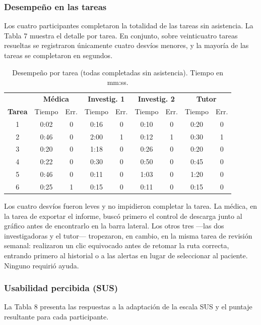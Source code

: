 \subsubsection{Desempeño en las tareas}
Los cuatro participantes completaron la totalidad de las tareas sin asistencia. La Tabla 7 muestra el detalle por tarea. En conjunto, sobre veinticuatro tareas resueltas se registraron únicamente cuatro desvíos menores, y la mayoría de las tareas se completaron en segundos.\\


\begin{table}[h]
\centering
\footnotesize
\setlength{\tabcolsep}{4pt}
\begin{tabular}{c cc cc cc cc}
\hline
 & \multicolumn{2}{c}{\textbf{Médica}} & \multicolumn{2}{c}{\textbf{Investig. 1}} & \multicolumn{2}{c}{\textbf{Investig. 2}} & \multicolumn{2}{c}{\textbf{Tutor}} \\
\textbf{Tarea} & Tiempo & Err. & Tiempo & Err. & Tiempo & Err. & Tiempo & Err. \\
\hline
1 & 0:02 & 0 & 0:16 & 0 & 0:10 & 0 & 0:20 & 0 \\
2 & 0:46 & 0 & 2:00 & 1 & 0:12 & 1 & 0:30 & 1 \\
3 & 0:20 & 0 & 1:18 & 0 & 0:26 & 0 & 0:20 & 0 \\
4 & 0:22 & 0 & 0:30 & 0 & 0:50 & 0 & 0:45 & 0 \\
5 & 0:46 & 0 & 0:11 & 0 & 1:03 & 0 & 1:20 & 0 \\
6 & 0:25 & 1 & 0:15 & 0 & 0:11 & 0 & 0:15 & 0 \\
\hline
\end{tabular}
\caption{Desempeño por tarea (todas completadas sin asistencia). Tiempo en mm:ss.}
\end{table}
Los cuatro desvíos fueron leves y no impidieron completar la tarea. La médica, en la tarea de exportar el informe, buscó primero el control de descarga junto al gráfico antes de encontrarlo en la barra lateral. Los otros tres —las dos investigadoras y el tutor— tropezaron, en cambio, en la misma tarea de revisión semanal: realizaron un clic equivocado antes de retomar la ruta correcta, entrando primero al historial o a las alertas en lugar de seleccionar al paciente. Ninguno requirió ayuda.\\


\subsubsection{Usabilidad percibida (SUS)}
La Tabla 8 presenta las respuestas a la adaptación de la escala SUS y el puntaje resultante para cada participante.\\


